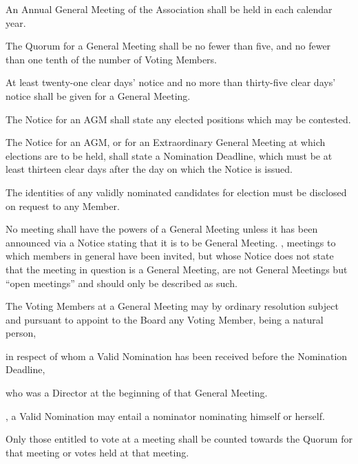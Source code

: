 \documentclass[10pt]{mk-articles-of-association}
\newcommand{\EC}[0]{Board}
\newcommand{\Exec}[0]{\EC{} }
\begin{document}
\begin{constenum}

  \item An Annual General Meeting of the Association shall be
    held in each calendar year.

  \item The Quorum for a General Meeting shall be no fewer than five, and
    no fewer than one tenth of the number of Voting Members.\label{quorum}

  \item At least twenty-one clear days' notice and no more than
    thirty-five clear days' notice shall be given for a General
    Meeting.

  \item The Notice for an AGM shall state any elected positions which
    may be contested.

  \item The Notice for an AGM, or for an Extraordinary General Meeting
    at which elections are to be held, shall state a Nomination
    Deadline, which must be at least thirteen clear days after the day
    on which the Notice is issued.

  \item The identities of any validly nominated candidates for
    election must be disclosed on request to any Member.

  \item No meeting shall have the powers of a General Meeting unless
    it has been announced via a Notice stating that it is to be
    General Meeting.  \avoiddoubt, meetings to which members in
    general have been invited, but whose Notice does not state that
    the meeting in question is a General Meeting, are not General
    Meetings but ``open meetings'' and should only be described as such.

  \item The Voting Members at a General Meeting may by ordinary
    resolution subject and pursuant to 
    appoint to the \Exec any Voting Member, being a natural person,
    \begin{constenum}
      \item in respect of whom a Valid Nomination has been received
        before the Nomination Deadline, \ITor
      \item who was a Director at the beginning of that General Meeting.
    \end{constenum}

  \item \avoiddoubt, a Valid Nomination may entail a nominator nominating
    himself or herself.

  \item Only those entitled to vote at a meeting shall be counted towards
    the Quorum for that meeting or votes held at that meeting.

\end{constenum}
\end{document}
